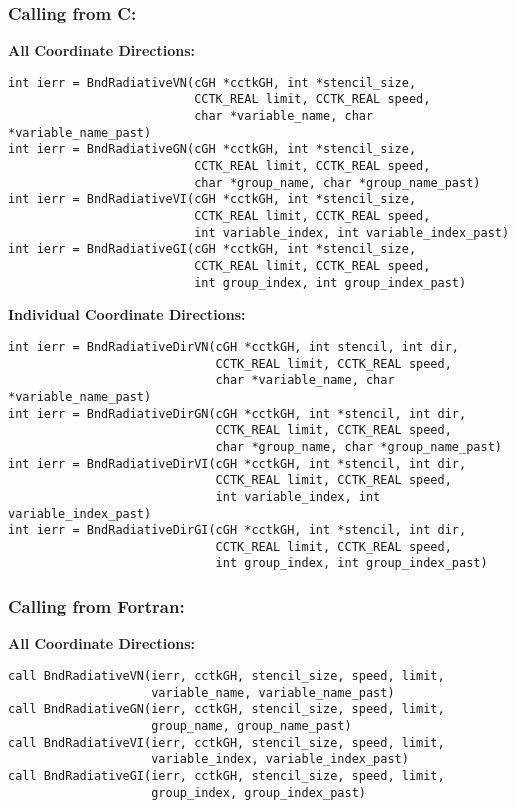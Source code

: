 \documentclass{article}
\begin{document}
\subsubsection*{Calling from C:}

{\bf All Coordinate Directions:}
\begin{verbatim}
int ierr = BndRadiativeVN(cGH *cctkGH, int *stencil_size, 
                          CCTK_REAL limit, CCTK_REAL speed, 
                          char *variable_name, char *variable_name_past)
int ierr = BndRadiativeGN(cGH *cctkGH, int *stencil_size, 
                          CCTK_REAL limit, CCTK_REAL speed,  
                          char *group_name, char *group_name_past)
int ierr = BndRadiativeVI(cGH *cctkGH, int *stencil_size, 
                          CCTK_REAL limit, CCTK_REAL speed,  
                          int variable_index, int variable_index_past)
int ierr = BndRadiativeGI(cGH *cctkGH, int *stencil_size, 
                          CCTK_REAL limit, CCTK_REAL speed,  
                          int group_index, int group_index_past)
\end{verbatim}

\noindent
{\bf Individual Coordinate Directions:}
\begin{verbatim}
int ierr = BndRadiativeDirVN(cGH *cctkGH, int stencil, int dir,
                             CCTK_REAL limit, CCTK_REAL speed, 
                             char *variable_name, char *variable_name_past)
int ierr = BndRadiativeDirGN(cGH *cctkGH, int *stencil, int dir, 
                             CCTK_REAL limit, CCTK_REAL speed,  
                             char *group_name, char *group_name_past)
int ierr = BndRadiativeDirVI(cGH *cctkGH, int *stencil, int dir, 
                             CCTK_REAL limit, CCTK_REAL speed,  
                             int variable_index, int variable_index_past)
int ierr = BndRadiativeDirGI(cGH *cctkGH, int *stencil, int dir, 
                             CCTK_REAL limit, CCTK_REAL speed,  
                             int group_index, int group_index_past)
\end{verbatim}

\subsubsection*{Calling from Fortran:}

{\bf All Coordinate Directions:}
\begin{verbatim}
call BndRadiativeVN(ierr, cctkGH, stencil_size, speed, limit, 
                    variable_name, variable_name_past)
call BndRadiativeGN(ierr, cctkGH, stencil_size, speed, limit, 
                    group_name, group_name_past)
call BndRadiativeVI(ierr, cctkGH, stencil_size, speed, limit, 
                    variable_index, variable_index_past)
call BndRadiativeGI(ierr, cctkGH, stencil_size, speed, limit, 
                    group_index, group_index_past)
\end{verbatim}
\end{document}
